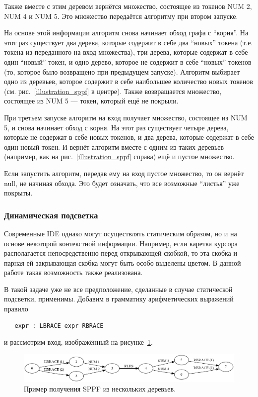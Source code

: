 Также вместе с этим деревом вернётся множество, состоящее из токенов NUM 2, NUM 4 и NUM 5. Это множество передаётся алгоритму при втором запуске. 

На основе этой информации алгоритм снова начинает обход графа с ``корня''. На этот раз существует два дерева, которые содержат в себе два ``новых'' токена (т.е. токена из переданного на вход множества), три дерева, которые содержат в себе один ``новый'' токен, и одно дерево, которое не содержит в себе ``новых'' токенов (то, которое было возвращено при предыдущем запуске). Алгоритм выбирает одно из деревьев, которое содержит в себе наибольшее количество новых токенов (см. рис.~\ref{illustration_sppf} в центре). Также возвращается множество, состоящее из NUM 5 --- токен, который ещё не покрыли. 

При третьем запуске алгоритм на вход получает множество, состоящее из NUM 5, и снова начинает обход с корня. На этот раз существует четыре дерева, которые не содержат в себе новых токенов, и два дерева, которые содержат в себе один новый токен. И вернёт алгоритм вместе с одним из таких деревьев (например, как на рис.~\ref{illustration_sppf} справа) ещё и пустое множество.

Если запустить алгоритм, передав ему на вход пустое множество, то он вернёт null, не начиная обхода. Это будет означать, что все возможные ``листья'' уже покрыты. 
\subsubsection{Динамическая подсветка}
Современные IDE однако могут осуществлять статическим образом, но и на основе некоторой контекстной информации. Например, если каретка курсора располагается непосредственно перед открывающей скобкой, то эта скобка и парная ей закрывающая скобка могут быть особо выделены цветом. В данной работе такая возможность также реализована. 

В такой задаче уже не все предположение, сделанные в случае статической подсветки, применимы. Добавим в грамматику арифметических выражений правило 

\begin{verbatim}
   expr : LBRACE expr RBRACE
\end{verbatim}

и рассмотрим вход, изображённый на рисунке~\ref{dynamic_input}. 

\begin{figure}[t]
\centering
\includegraphics[width=\linewidth]{Ivanov/Pictures/dynamic_input.png}
\caption{Пример получения SPPF из нескольких деревьев.}
\label{dynamic_input}
\end{figure}

